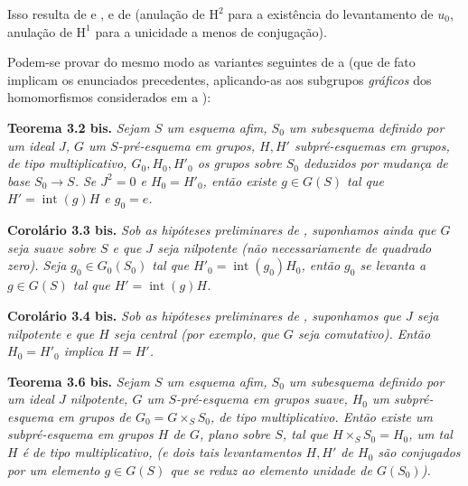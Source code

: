 Isso resulta de  e
, e de
 (anulação de \(\mathrm H^2\)
para a existência do levantamento de \(u_0\), anulação de
\(\mathrm H^1\) para a unicidade a menos de conjugação).

Podem-se provar do mesmo modo as variantes seguintes de
 a
 (que de fato implicam os
enunciados precedentes, aplicando-as aos subgrupos \emph{gráficos}
dos homomorfismos considerados em
 a
):

\medskip
\noindent{}\textbf{Teorema 3.2 bis.}
\textit{Sejam \(S\) um esquema afim, \(S_0\) um subesquema definido
por um ideal \(J\), \(G\) um \(S\)-pré-esquema em grupos,
\(H,H'\) subpré-esquemas em grupos, de tipo multiplicativo,
\(G_0,H_0,H'_0\) os grupos sobre \(S_0\) deduzidos por mudança de
base \(S_0\to S\). Se \(J^2=0\) e \(H_0=H'_0\), então existe
\(g\in G(S)\) tal que \(H'=\operatorname{int}(g)H\) e \(g_0=e\).}

\medskip
\noindent{}\textbf{Corolário 3.3 bis.}
\textit{Sob as hipóteses preliminares de
, suponhamos ainda que \(G\)
seja suave sobre \(S\) e que \(J\) seja nilpotente (não necessariamente
de quadrado zero). Seja \(g_0\in G_0(S_0)\) tal que
\(H'_0=\operatorname{int}(g_0)H_0\), então \(g_0\) se levanta a
\(g\in G(S)\) tal que \(H'=\operatorname{int}(g)H\).}

\medskip
\noindent{}\textbf{Corolário 3.4 bis.}
\textit{Sob as hipóteses preliminares de
, suponhamos que \(J\) seja
nilpotente e que \(H\) seja central (por exemplo, que \(G\) seja
comutativo). Então \(H_0=H'_0\) implica \(H=H'\).}

\medskip
\noindent{}\textbf{Teorema 3.6 bis.}
\textit{Sejam \(S\) um esquema afim, \(S_0\) um subesquema definido
por um ideal \(J\) nilpotente, \(G\) um \(S\)-pré-esquema em grupos
suave, \(H_0\) um subpré-esquema em grupos de
\(G_0=G\times_S S_0\), de tipo multiplicativo. Então
existe um
subpré-esquema em grupos \(H\) de \(G\), plano sobre \(S\), tal
que \(H\times_S S_0=H_0\),
um
 tal \(H\) é de tipo multiplicativo,
(e dois tais
levantamentos \(H,H'\) de \(H_0\) são conjugados por um elemento
\(g\in G(S)\) que se reduz ao elemento unidade de \(G(S_0)\)).}

